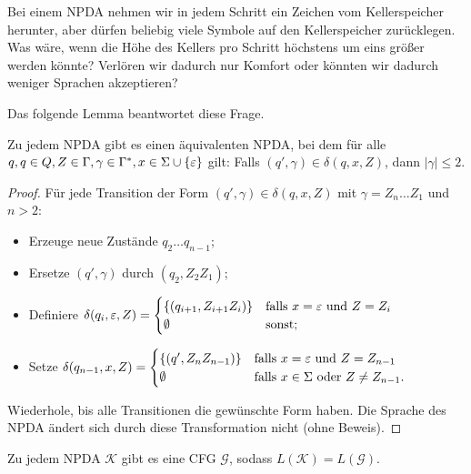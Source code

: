 Bei einem \ac{NPDA} nehmen wir in jedem Schritt ein Zeichen vom Kellerspeicher herunter,
aber dürfen beliebig viele Symbole auf den Kellerspeicher zurücklegen.
Was wäre, wenn die Höhe des Kellers pro Schritt höchstens um eins größer werden könnte?
Verlören wir dadurch nur Komfort oder könnten wir dadurch weniger Sprachen akzeptieren?

Das folgende Lemma beantwortet diese Frage.
\begin{lemma}\label{lem:4.limitStackIncrease}
        Zu jedem \ac{NPDA} gibt es einen äquivalenten \ac{NPDA}, bei dem
        für alle $q,q\in Q, Z\in\Gamma, \gamma\in\Gamma^*, x\in\Sigma\cup\{\varepsilon\}$
        gilt: Falls $(q',\gamma)\in\delta(q,x,Z)$, dann $|\gamma| \le 2$.
\end{lemma}
\begin{proof}
        Für jede Transition der Form $(q',\gamma)\in\delta(q,x,Z)$ mit
        $\gamma = Z_n\dots Z_1$ und $n>2$:
        \begin{itemize}
        \item Erzeuge neue Zustände $q_2\dots q_{n-1}$;
        \item Ersetze $(q',\gamma)$ durch $(q_2, Z_2Z_1)$;
        \item Definiere
          $\delta(q_i, \varepsilon, Z) =
          \begin{cases}
           \{ (q_{i+1}, Z_{i+1}Z_i) \} & \text{falls }x = \varepsilon\text{
             und }Z = Z_i \\
           \emptyset & \text{sonst;}
         \end{cases}
         $
        \item Setze $\delta(q_{n-1}, x, Z) =
          \begin{cases}
            \{ (q', Z_nZ_{n-1}) \} & \text{falls }x = \varepsilon\text{ und
            }Z = Z_{n-1}
            \\
            \emptyset & \text{falls }x\in\Sigma\text{ oder }Z\ne
            Z_{n-1}
            \text.
          \end{cases}
          $
        \end{itemize}
        Wiederhole, bis alle Transitionen die gewünschte Form haben.
        Die Sprache des \ac{NPDA} ändert sich durch diese Transformation nicht (ohne Beweis).\qedhere
\end{proof}


\begin{lemma}\label{lem:4.npdaToCfg}
 Zu jedem \ac{NPDA} $\mathcal{K}$ gibt es eine \ac{CFG} $\mathcal{G}$, sodass $L(\mathcal{K})=L(\mathcal{G})$.
\end{lemma}

